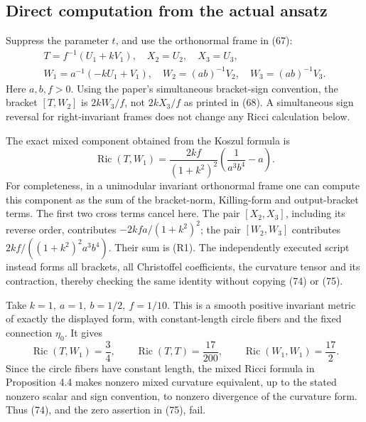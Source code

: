 \documentclass[10pt]{article}
\begin{document}
\subsection*{Direct computation from the actual ansatz}
Suppress the parameter \(t\), and use the orthonormal frame in (67): \[\begin{gathered} T=f^{-1}(U_1+kV_1),\quad X_2=U_2,\quad X_3=U_3,\\
 W_1=a^{-1}(-kU_1+V_1),\quad
 W_2=(ab)^{-1}V_2,\quad W_3=(ab)^{-1}V_3.\end{gathered}\] Here \(a,b,f>0\). Using the paper’s simultaneous bracket-sign convention, the bracket \([T,W_2]\) is \(2kW_3/f\), not \(2kX_3/f\) as printed in (68). A simultaneous sign reversal for right-invariant frames does not change any Ricci calculation below.\par
The exact mixed component obtained from the Koszul formula is \[\operatorname{Ric}(T,W_1)=\frac{2kf}{(1+k^2)^2}
       \left(\frac{1}{a^3b^4}-a\right).
 \tag{R1}\] For completeness, in a unimodular invariant orthonormal frame one can compute this component as the sum of the bracket-norm, Killing-form and output-bracket terms. The first two cross terms cancel here. The pair \([X_2,X_3]\), including its reverse order, contributes \(-2kfa/(1+k^2)^2\); the pair \([W_2,W_3]\) contributes \(2kf/((1+k^2)^2a^3b^4)\). Their sum is (R1). The independently executed script instead forms all brackets, all Christoffel coefficients, the curvature tensor and its contraction, thereby checking the same identity without copying (74) or (75).\par
Take \(k=1,\ a=1,\ b=1/2,\ f=1/10\). This is a smooth positive invariant metric of exactly the displayed form, with constant-length circle fibers and the fixed connection \(\eta_0\). It gives \[\operatorname{Ric}(T,W_1)=\frac34,\qquad
 \operatorname{Ric}(T,T)=\frac{17}{200},\qquad
 \operatorname{Ric}(W_1,W_1)=\frac{17}{2}.\] Since the circle fibers have constant length, the mixed Ricci formula in Proposition 4.4 makes nonzero mixed curvature equivalent, up to the stated nonzero scalar and sign convention, to nonzero divergence of the curvature form. Thus (74), and the zero assertion in (75), fail.\par
\end{document}
